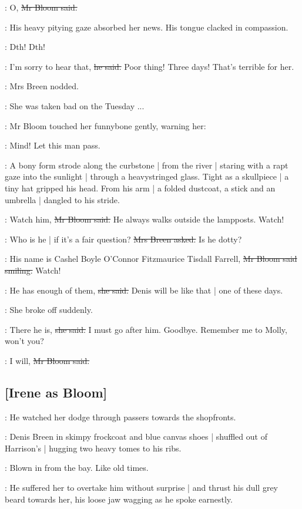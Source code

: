 \Bloom:
O,
\sout{Mr Bloom said.}

:
His heavy pitying gaze absorbed her news.
His tongue clacked in compassion.

\Bloom:
Dth!
Dth!

\Bloom:
I'm sorry to hear that,
\sout{he said.}
Poor thing!
Three days!
That's terrible for her.%

:
Mrs Breen nodded.

\josie:
She was taken bad on the Tuesday ...

:
Mr Bloom touched her funnybone gently,
warning her:

\Bloom:
Mind!
Let this man pass.

:
A bony form strode along the curbstone |
from the river |
staring with a rapt gaze into the sunlight |
through a heavystringed glass.
Tight as a skullpiece |
a tiny hat gripped his head.
From his arm |
a folded dustcoat, a stick and an umbrella |
dangled to his stride.

\Bloom:
Watch him,
\sout{Mr Bloom said.}
He always walks outside the lampposts.
Watch!%

\josie:
Who is he |
if it's a fair question?
\sout{Mrs Breen asked.}
Is he dotty?

\Bloom:
His name is Cashel Boyle O'Connor Fitzmaurice Tisdall Farrell,
\sout{Mr Bloom said smiling.}
Watch!

\josie:
He has enough of them,
\sout{she said.}
Denis will be like that |
one of these days.

:
She broke off suddenly.

\josie:
There he is,
\sout{she said.}
I must go after him.
Goodbye.
Remember me to Molly,
won't you?

\Bloom:
I will,
\sout{Mr Bloom said.}

\subsection{[Irene as Bloom]}

:
He watched her dodge through passers towards the shopfronts.

:
Denis Breen in skimpy frockcoat and blue canvas shoes |
shuffled out of Harrison's |
hugging two heavy tomes to his ribs.

\BloomInt:
Blown in from the bay.
Like old times.

:
He suffered her to overtake him without surprise |
and thrust his dull grey beard towards her,
his loose jaw wagging as he spoke earnestly.

